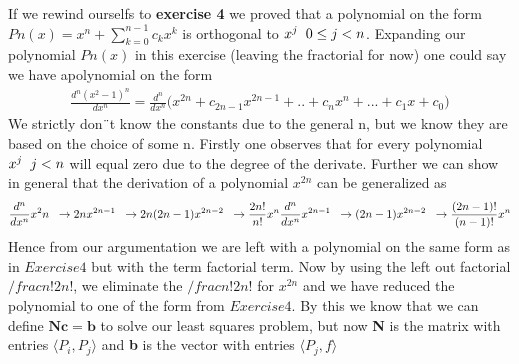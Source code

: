 \documentclass[a4paper,norsk]{article}
\begin{document}
If we rewind ourselfs to \textbf{exercise 4} we proved that a polynomial on the form $Pn(x) = x^n + \sum_{k=0}^{n-1}c_k x^k$ is orthogonal to 
$x^j \hspace{2mm} 0 \leq j < n$. Expanding our polynomial $Pn(x)$ in this exercise (leaving the fractorial for now) one could say we have apolynomial on the form
\begin{align}
\frac{d^n(x^2-1)^n}{dx^n} = \frac{d^n}{dx^n} \Big(x^{2n} + c_{2n-1}x^{2n-1} + .. + c_{n}x^{n} + ... + c_{1}x + c_{0} \Big)	
\end{align} 
We strictly don¨t know the constants due to the general n, but we know they are based on the choice of some n.
Firstly one observes that for every polynomial $x^j \hspace{2mm} j < n$ will equal zero due to the degree of the derivate. Further we can show in general 
that the derivation of a polynomial $x^{2n}$ can be generalized as 
\begin{align}
\frac{d^n}{dx^n}x^2n \hspace{2mm} \rightarrow 2nx^{2n-1} \hspace{2mm} \rightarrow 2n(2n-1)x^{2n-2}\hspace{2mm} \rightarrow \frac{2n!}{n!}x^n
\frac{d^n}{dx^n}x^{2n-1} \hspace{2mm} \rightarrow (2n-1)x^{2n-2}\hspace{2mm} \rightarrow \frac{(2n-1)!}{(n-1)!}x^n
\end{align}
Hence from our argumentation we are left with a polynomial on the same form as in $Exercise 4$ but with the term factorial term. Now by using the left out factorial
$/frac{n!}{2n!}$, we eliminate the $/frac{n!}{2n!}$ for $x^{2n}$ and we have reduced the polynomial to one of the form from  $Exercise 4$. By this we know that we
can define $\mathbf{Nc=b} $ to solve our least squares problem, but now
\textbf{N} is the matrix with entries $\langle P_i, P_j \rangle$ and \textbf{b} is the vector with entries $\langle P_j, f \rangle$ 
\end{document}
